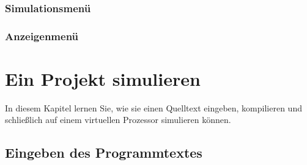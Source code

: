 \documentclass[11pt,a4paper]{hsfuldabook}
\begin{document}
\subsection{Simulationsmenü}

\subsection{Anzeigenmenü}

\chapter {Ein Projekt simulieren}
In diesem Kapitel lernen Sie, wie sie einen Quelltext eingeben, kompilieren und schließlich auf einem
virtuellen Prozessor simulieren können.

\section{Eingeben des Programmtextes}
\end{document}
